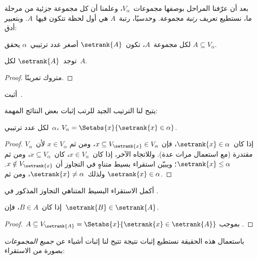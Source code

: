 \documentclass[../../../include/open-logic-section]{subfiles}
\begin{document}

بعد أن عرّفنا المراحل بوصفها مجموعات~$V_\alpha$، وعلمنا أن كل مجموعة
جزئية من مرحلة ما، نستطيع تعريف \emph{رتبة} مجموعة. وحدسيًا، رتبة~$A$
هي أول لحظة تتكون فيها~$A$. وبتعبير أدق:

\begin{defn}
لكل مجموعة~$A$، تكون~$\setrank{A}$ أصغر عدد ترتيبي~$\alpha$ يحقق
$A \subseteq V_\alpha$.
\end{defn}
\begin{prop}
	توجد~$\setrank{A}$ لكل~$A$.
\end{prop}
\begin{proof}
	متروك تمرينًا.
\end{proof}
\begin{prob}
	أثبت~.
\end{prob}
\noindent
يتيح لنا الترتيب الجيد للرتب إثبات بعض النتائج المهمة:
\begin{prop}
لكل عدد ترتيبي~$\alpha$،
$V_\alpha = \Setabs{x}{\setrank{x} \in \alpha}$.
\end{prop}

\begin{proof}
إذا كان~$\setrank{x} \in \alpha$، فإن
$x \subseteq V_{\setrank{x}} \in V_\alpha$، ومن ثم
$x \in V_\alpha$ لأن~$V_\alpha$ مقتدرة (مع استعمال
 مرات عدة). وللاتجاه الآخر، إذا
كان~$x \in V_\alpha$، كان~$x \subseteq V_\alpha$، ومن ثم
$\setrank{x} \leq \alpha$؛ ويبيّن استقراء بسيط متناهٍ في التجاوز أن
$x \notin V_{\setrank{x}}$. ولذلك~$\setrank{x} \neq \alpha$، ومن ثم
$\setrank{x} \in \alpha$.
\end{proof}
\begin{prob}
	أكمل الاستقراء البسيط المتناهي التجاوز المذكور في
	.
\end{prob}

\begin{prop}
إذا كان~$B \in A$، فإن~$\setrank{B} \in \setrank{A}$.
\end{prop}

\begin{proof}
$A \subseteq V_{\setrank{A}} =
\Setabs{x}{\setrank{x} \in \setrank{A}}$ بموجب
.
\end{proof}
\noindent
باستعمال هذه الحقيقة نستطيع إثبات نتيجة تتيح لنا إثبات أشياء عن
\emph{جميع المجموعات} بصورة من الاستقراء:
\end{document}
